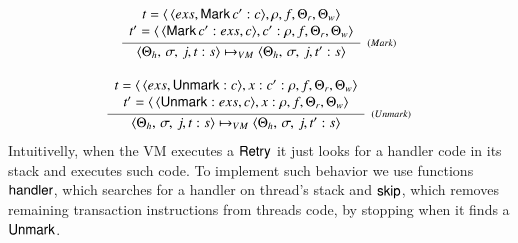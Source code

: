 \documentclass[3p,times,procedia]{elsarticle}
\theoremstyle{definition}
\newcommand{\C}[1]{\red{\mathsf{#1}}}
\newcommand{\F}[1]{\green{\mathsf{#1}}}
\begin{document}
\[
   \begin{array}{c}
      \infer[_{(Mark)}]
            {\langle \Theta_h,\,\sigma,\,j,t : s\rangle \mapsto_{VM}
             \langle \Theta_h,\,\sigma,\,j,t' : s\rangle}
            {\begin{array}{c}
               t = \langle\,\langle exs, \ensuremath{\C{Mark}}\,c' : c\rangle,\rho, f, \Theta_r,\Theta_w\rangle \\
               t' = \langle\,\langle \ensuremath{\C{Mark}}\,c' : exs,  c\rangle,c' : \rho, f, \Theta_r,\Theta_w\rangle
             \end{array}} \\ \\
      \infer[_{(Unmark)}]
            {\langle \Theta_h,\,\sigma,\,j,t : s\rangle \mapsto_{VM}
             \langle \Theta_h,\,\sigma,\,j,t' : s\rangle}
            {\begin{array}{c}
               t = \langle\,\langle exs, \ensuremath{\C{Unmark}} : c\rangle,x : c' : \rho, f, \Theta_r,\Theta_w\rangle \\
               t' = \langle\,\langle \ensuremath{\C{Unmark}} : exs,  c\rangle, x: \rho, f, \Theta_r,\Theta_w\rangle
             \end{array}}
   \end{array}
\]
Intuitivelly, when the VM executes a \ensuremath{\C{Retry}} it just looks for a handler code in its stack and executes such code.
To implement such behavior we use functions \ensuremath{\F{handler}}, which searches for a handler on thread's stack and \ensuremath{\F{skip}}, which
removes remaining transaction instructions from threads code, by stopping when it finds a \ensuremath{\C{Unmark}}.
\end{document}
